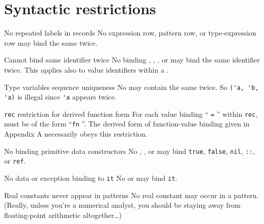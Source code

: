 \section{Syntactic restrictions}\label{sec:syntax-core:syntactic-restrictions}

\begin{clause}{No repeated labels in records}\label{clause:syntax-core:restriction:no-repeated-labels-in-records}
No expression row, pattern row, or type-expression row may bind the same
 twice.
\end{clause}

\begin{clause}{Cannot bind same identifier twice}\label{clause:syntax-core:restriction:no-repeated-identifiers}
No binding , , , or  may bind the
same identifier twice. This applies also to value identifiers within a
. 
\end{clause}

\begin{clause}{Type variables sequence uniqueness}\label{clause:syntax-core:restriction:type-variables-uniqueness}
No  may contain the same  twice. So \verb|('a, 'b, 'a)|
is illegal since \verb|'a| appears twice.
\end{clause}

\begin{clause}{\texttt{rec} restriction for derived function form}
For each value binding `` \texttt{=} '' within \texttt{rec},
 must be of the form ``\texttt{fn} ''. The derived form of
function-value binding given in Appendix A necessarily obeys this restriction.
\end{clause}

\begin{clause}{No binding primitive data constructors}
No , , or  may bind \texttt{true},
\texttt{false}, \texttt{nil}, \texttt{::}, or \texttt{ref}.
\end{clause}

\begin{clause}{No data or exception binding to \texttt{it}}
No  or  may bind \texttt{it}.
\end{clause}

\begin{clause}{Real constants never appear in patterns}
No real constant may occur in a pattern. (Really, unless you're a
numerical analyst, you should be staying away from floating-point
arithmetic altogether\dots)
\end{clause}


